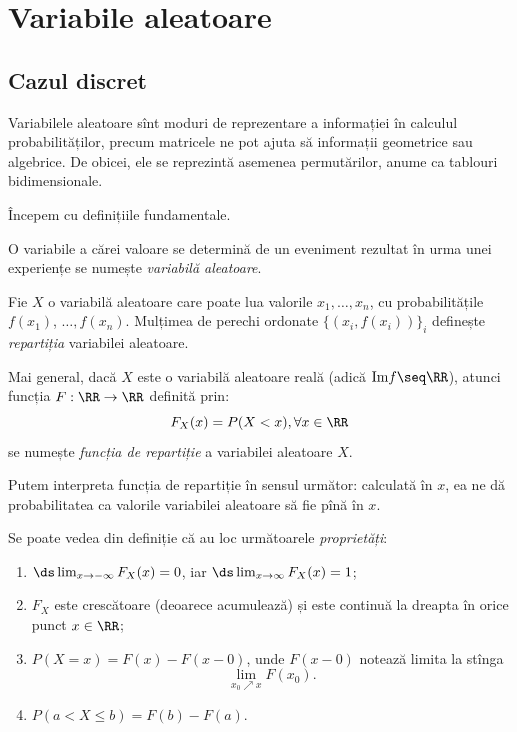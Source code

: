 
\chapter{Variabile aleatoare}

\section{Cazul discret}

\indent\indent Variabilele aleatoare sînt moduri de reprezentare a informației
în calculul probabilităților, precum matricele ne pot ajuta să 
informații geometrice sau algebrice. De obicei, ele se reprezintă asemenea
permutărilor, anume ca tablouri bidimensionale.

Începem cu definițiile fundamentale.

\begin{definition}\label{def:v-al}
  O variabile a cărei valoare se determină de un eveniment rezultat în urma
  unei experiențe se numește \emph{variabilă aleatoare}.
\end{definition}

\begin{definition}\label{def:repartitie}
  Fie $ X $ o variabilă aleatoare care poate lua valorile $ x_1, \dots, x_n $,
  cu probabilitățile $ f(x_1) $, $ \dots, f(x_n) $. Mulțimea de perechi ordonate
  $ \{ (x_i, f(x_i)) \}_i $ definește \emph{repartiția} variabilei aleatoare.

  Mai general, dacă $ X $ este o variabilă aleatoare reală (adică
  $ \mathrm{Im} f \seq \RR $), atunci funcția $ F : \RR \to \RR $ definită prin:
  \[
    F_X(x) = P(X < x), \forall x \in \RR
  \]
  se numește \emph{funcția de repartiție} a variabilei aleatoare $ X $.
\end{definition}

Putem interpreta funcția de repartiție în sensul următor: calculată în $ x $, ea
ne dă probabilitatea ca valorile variabilei aleatoare să fie pînă în $ x $.

Se poate vedea din definiție că au loc următoarele \emph{proprietăți}:
\begin{enumerate}[(1)]
\item $ \ds\lim_{x \to -\infty} F_X(x) = 0 $, iar $ \ds\lim_{x \to \infty} F_X(x) = 1 $;
\item $ F_X $ este crescătoare (deoarece acumulează) și este continuă la dreapta în
  orice punct $ x \in \RR $;
\item $ P(X = x) = F(x) - F(x - 0) $, unde $ F(x - 0) $ notează limita la stînga
  \[
    \lim_{x_0 \nearrow x} F(x_0).
  \]
\item $ P(a < X \leq b) = F(b) - F(a) $.
\end{enumerate}

